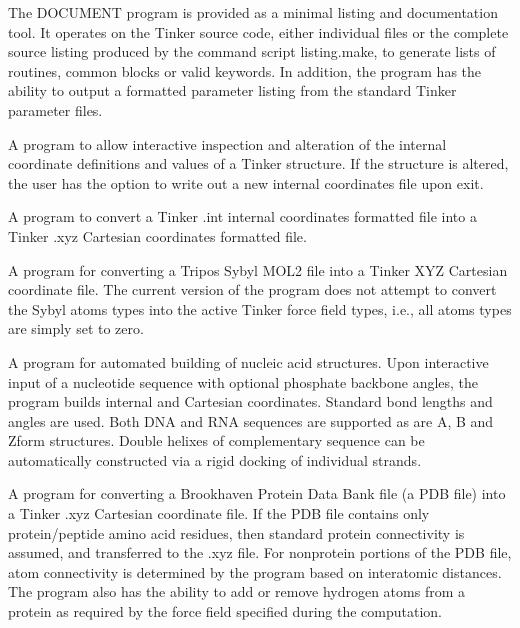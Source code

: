 \documentclass[letterpaper,11pt,english]{sphinxmanual}
\begin{document}

The DOCUMENT program is provided as a minimal listing and documentation tool. It operates on the Tinker source code, either individual files or the complete source listing produced by the command script listing.make, to generate lists of routines, common blocks or valid keywords. In addition, the program has the ability to output a formatted parameter listing from the standard Tinker parameter files.


A program to allow interactive inspection and alteration of the internal coordinate definitions and values of a Tinker structure. If the structure is altered, the user has the option to write out a new internal coordinates file upon exit.


A program to convert a Tinker .int internal coordinates formatted file into a Tinker .xyz Cartesian coordinates formatted file.


A program for converting a Tripos Sybyl MOL2 file into a Tinker XYZ Cartesian coordinate file. The current version of the program does not attempt to convert the Sybyl atoms types into the active Tinker force field types, i.e., all atoms types are simply set to zero.


A program for automated building of nucleic acid structures. Upon interactive input of a nucleotide sequence with optional phosphate backbone angles, the program builds internal and Cartesian coordinates. Standard bond lengths and angles are used. Both DNA and RNA sequences are supported as are A\sphinxhyphen{}, B\sphinxhyphen{} and Z\sphinxhyphen{}form structures. Double helixes of complementary sequence can be automatically constructed via a rigid docking of individual strands.


A program for converting a Brookhaven Protein Data Bank file (a PDB file) into a Tinker .xyz Cartesian coordinate file. If the PDB file contains only protein/peptide amino acid residues, then standard protein connectivity is assumed, and transferred to the .xyz file. For non\sphinxhyphen{}protein portions of the PDB file, atom connectivity is determined by the program based on interatomic distances. The program also has the ability to add or remove hydrogen atoms from a protein as required by the force field specified during the computation.
\end{document}
